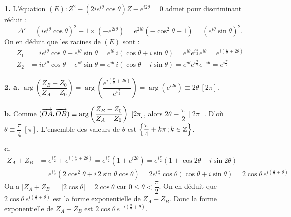 \documentclass[11pt]{article}
\begin{document}


\textbf{1.} L'équation $(E) : Z^2 - (2ie^{i\theta}\cos\theta)Z - e^{i2\theta} = 0$ admet pour discriminant réduit :
\[ \Delta' = (ie^{i\theta}\cos\theta)^2 - 1 \times (-e^{2i\theta}) = e^{2i\theta}(-\cos^2\theta + 1) = (e^{i\theta}\sin\theta)^2. \]
On en déduit que les racines de $(E)$ sont :
\begin{align*}
Z_1 &= ie^{i\theta}\cos\theta - e^{i\theta}\sin\theta = e^{i\theta}\,i(\cos\theta + i\sin\theta) = e^{i\theta}e^{i\frac{\pi}{2}}e^{i\theta} = e^{i\left(\frac{\pi}{2} + 2\theta\right)} \\
Z_2 &= ie^{i\theta}\cos\theta + e^{i\theta}\sin\theta = e^{i\theta}\,i(\cos\theta - i\sin\theta) = e^{i\theta}e^{i\frac{\pi}{2}}e^{-i\theta} = e^{i\frac{\pi}{2}}
\end{align*}

\textbf{2. a.} $\arg\left(\dfrac{Z_B - Z_0}{Z_A - Z_0}\right) = \arg\left(\dfrac{e^{i\left(\frac{\pi}{2} + 2\theta\right)}}{e^{i\frac{\pi}{2}}}\right) = \arg(e^{i2\theta}) \equiv 2\theta\ [2\pi]$.

\textbf{b.} Comme $(\vv{OA}, \vv{OB}) \equiv \arg\left(\dfrac{Z_B - Z_0}{Z_A - Z_0}\right)\ [2\pi]$, alors $2\theta \equiv \dfrac{\pi}{2}\ [2\pi]$. D'où $\theta \equiv \dfrac{\pi}{4}\ [\pi]$. L'ensemble des valeurs de $\theta$ est $\left\{\dfrac{\pi}{4} + k\pi\,;k \in \mathbb{Z}\right\}$.

\textbf{c.}
\begin{align*}
Z_A + Z_B &= e^{i\frac{\pi}{2}} + e^{i\left(\frac{\pi}{2} + 2\theta\right)} = e^{i\frac{\pi}{2}}(1 + e^{i2\theta}) = e^{i\frac{\pi}{2}}(1 + \cos 2\theta + i\sin 2\theta) \\
&= e^{i\frac{\pi}{2}}(2\cos^2\theta + i\,2\sin\theta\cos\theta) = 2e^{i\frac{\pi}{2}}\cos\theta(\cos\theta + i\sin\theta) = 2\cos\theta\,e^{i\left(\frac{\pi}{2} + \theta\right)}
\end{align*}
On a $|Z_A + Z_B| = |2\cos\theta| = 2\cos\theta$ car $0 \le \theta < \dfrac{\pi}{2}$. On en déduit que $2\cos\theta\,e^{i\left(\frac{\pi}{2} + \theta\right)}$ est la forme exponentielle de $Z_A + Z_B$. Donc la forme exponentielle de $\overline{Z_A + Z_B}$ est $2\cos\theta\,e^{-i\left(\frac{\pi}{2} + \theta\right)}$.

\end{document}
